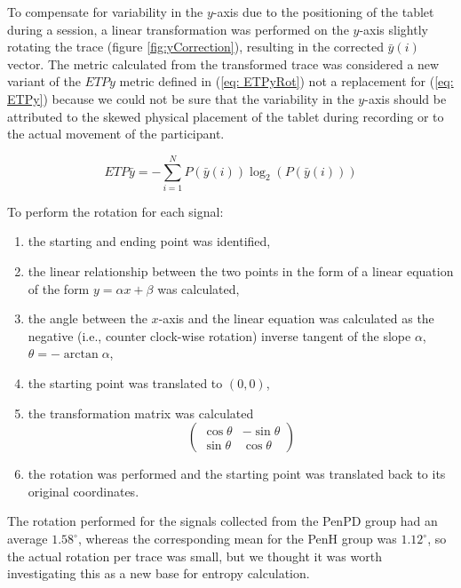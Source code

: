 To compensate for variability in the $y$-axis due to the positioning of the tablet during a session, a linear transformation was performed on the $y$-axis slightly rotating the trace (figure \ref{fig:yCorrection}), resulting in the corrected $\bar{y}(i)$ vector. The metric calculated from the transformed trace was considered a new variant of the $ETPy$ metric defined in (\ref{eq: ETPyRot}) not a replacement for (\ref{eq: ETPy}) because we could not be sure that the variability in the $y$-axis should be attributed to the skewed physical placement of the tablet during recording or to the actual movement of the participant. 

\begin{equation} \label{eq: ETPyRot}
ETP\bar{y} = -\sum_{i=1}^{N}P(\bar{y}(i))\log_{2}(P(\bar{y}(i)))
\end{equation}

To perform the rotation for each signal:
\begin{enumerate}
\item the starting and ending point was identified,
\item the linear relationship between the two points in the form of a linear equation of the form $y = {\alpha}x+{\beta}$ was calculated,
\item the angle between the $x$-axis and the linear equation was calculated as the negative (i.e., counter clock-wise rotation) inverse tangent of the slope ${\alpha}$, ${\theta}=-\arctan{\alpha}$,
\item the starting point was translated to $(0,0)$,
\item the transformation matrix was calculated
\begin{equation}
\begin{pmatrix}
\cos{\theta} & -\sin{\theta} \\
\sin{\theta} & \cos{\theta}
\end{pmatrix}
\end{equation}
\item the rotation was performed and the starting point was translated back to its original coordinates. 
\end{enumerate}
The rotation performed for the signals collected from the \gls{PenPD} group had an average $1.58^{\circ}$, whereas the corresponding mean for the \gls{PenH} group was $1.12^{\circ}$, so the actual rotation per trace was small, but we thought it was worth investigating this as a new base for entropy calculation. 

